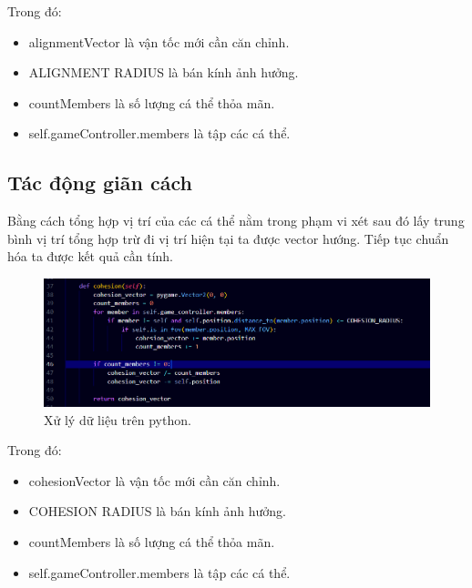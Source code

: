 \documentclass{article}
\begin{document}
Trong đó:
\begin{itemize}
\item alignmentVector là vận tốc mới cần căn chỉnh.
\item ALIGNMENT RADIUS là bán kính ảnh hưởng.
\item countMembers là số lượng cá thể thỏa mãn.
\item self.gameController.members là tập các cá thể.
\end{itemize}


\subsection{Tác động giãn cách}
Bằng cách tổng hợp vị trí của các cá thể nằm trong phạm vi xét sau đó lấy trung bình vị trí tổng hợp trừ đi vị trí hiện tại ta được vector hướng. Tiếp tục chuẩn hóa ta được kết quả cần tính.\\
\begin{figure}[htbp]
  \centering
  \includegraphics[width=0.5\linewidth]{cohesion.png} 
  \caption{Xử lý dữ liệu trên python.}
\end{figure}

Trong đó:
\begin{itemize}
\item cohesionVector là vận tốc mới cần căn chỉnh.
\item COHESION RADIUS là bán kính ảnh hưởng.
\item countMembers là số lượng cá thể thỏa mãn.
\item self.gameController.members là tập các cá thể.
\end{itemize}
\end{document}
